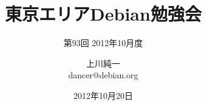 




\documentclass[cjk,dvipdfmx,12pt]{beamer}
\usepackage{monthlypresentation}



\title{東京エリアDebian勉強会}
\subtitle{第93回 2012年10月度}
\author{上川純一\\dancer@debian.org}
\date{2012年10月20日}




